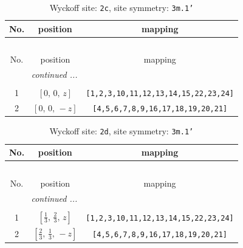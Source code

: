 \documentclass[fleqn,8pt]{jsarticle}
\begin{document}
\begin{longtable}{ccc}
\caption{Wyckoff site: {\tt 2c}, site symmetry: {\tt 3m.1'}}
 \\
 \hline \hline
No. & position & mapping \\ \hline \endfirsthead

\multicolumn{2}{l}{\tablename\ \thetable{}} \\
 \hline \hline
No. & position & mapping \\ \hline \endhead

 \hline \hline
\multicolumn{2}{r}{\footnotesize\it continued ...} \\ \endfoot

 \hline \hline
\multicolumn{2}{r}{} \\ \endlastfoot

1 & $\left[ 0,\, 0,\, z \right]$ & {\tt [1,2,3,10,11,12,13,14,15,22,23,24]} \\ \hline
2 & $\left[ 0,\, 0,\, - z \right]$ & {\tt [4,5,6,7,8,9,16,17,18,19,20,21]} \\
\end{longtable}
\renewcommand{\arraystretch}{1.2}
\begin{longtable}{ccc}
\caption{Wyckoff site: {\tt 2d}, site symmetry: {\tt 3m.1'}}
 \\
 \hline \hline
No. & position & mapping \\ \hline \endfirsthead

\multicolumn{2}{l}{\tablename\ \thetable{}} \\
 \hline \hline
No. & position & mapping \\ \hline \endhead

 \hline \hline
\multicolumn{2}{r}{\footnotesize\it continued ...} \\ \endfoot

 \hline \hline
\multicolumn{2}{r}{} \\ \endlastfoot

1 & $\left[ \frac{1}{3},\, \frac{2}{3},\, z \right]$ & {\tt [1,2,3,10,11,12,13,14,15,22,23,24]} \\ \hline
2 & $\left[ \frac{2}{3},\, \frac{1}{3},\, - z \right]$ & {\tt [4,5,6,7,8,9,16,17,18,19,20,21]} \\
\end{longtable}
\renewcommand{\arraystretch}{1.2}
\end{document}

